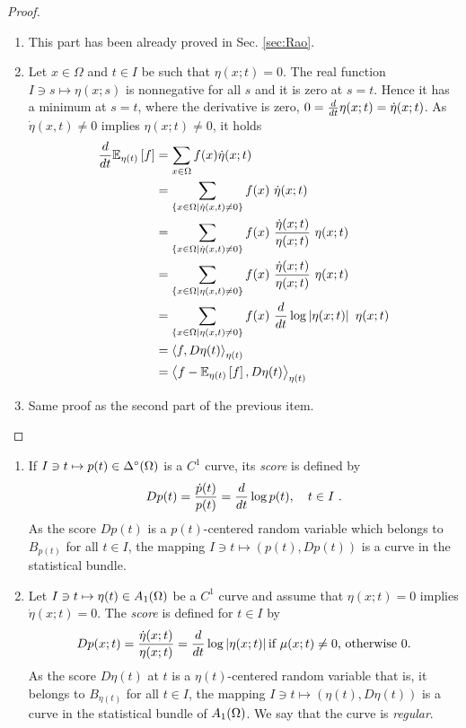 \documentclass[12pt,a4paper]{amsart}
\begin{document}
\begin{proof}
  \begin{enumerate}
  \item This part has been already proved in Sec. \ref{sec:Rao}.
  \item Let $x \in \Omega$ and $t \in I$ be such that $\eta(x;t) = 0$. The real function $I \ni s \mapsto \eta(x;s)$ is nonnegative for all $s$ and it is zero at $s=t$. Hence it has a minimum at $s=t$, where the derivative is zero, $0 = \frac{d}{dt} \eta(x;t) = \dot \eta(x;t)$. As $\dot\eta(x,t) \ne 0$ implies $\eta(x;t) \ne 0$, it holds
%
    \begin{align*}
  \derivby t \expectat {\eta(t)} {f} &= \sum_{x\in\Omega} f(x) \dot\eta(x;t) \\
&= \sum_{\setof{x\in\Omega}{\dot\eta(x,t) \ne 0}} f(x) \ \dot\eta(x;t) \\ 
&= \sum_{\setof{x\in\Omega}{\dot\eta(x,t) \ne 0}} f(x) \ \frac{\dot\eta(x;t)}{\eta(x;t)} \ \eta(x;t) \\ 
&= \sum_{\setof{x\in\Omega}{\eta(x,t) \ne 0}} f(x) \ \frac{\dot\eta(x;t)}{\eta(x;t)} \ \eta(x;t) \\ 
&= \sum_{\setof{x\in\Omega}{\eta(x,t) \ne 0}} f(x) \ \derivby t \log\avalof{\eta(x;t)} \ \eta(x;t) \\ 
&= \scalarat {\eta(t)} {f} {D\eta(t)} \\
&= \scalarat {\eta(t)} {f - \expectat {\eta(t)} f} {D\eta(t)}    
    \end{align*}
  \item Same proof as the second part of the previous item.
  \end{enumerate}
\end{proof}

\begin{definition}[Score]
\begin{enumerate}
\item
If $I \ni t \mapsto p(t) \in \Delta^\circ(\Omega)$ is a $C^1$ curve, its \emph{score} is defined by
%
\begin{equation*}
  D p(t) = \frac{\dot p(t)}{p(t)} = \derivby t \log p(t), \quad t \in I \ .
\end{equation*}
%
As the score $Dp(t)$ is a $p(t)$-centered random variable which belongs to $B_{p(t)}$ for all $t \in I$, the mapping $I \ni t \mapsto (p(t),D p(t))$ is a curve in the statistical bundle.
%
\item
Let $I \ni t \mapsto \eta(t) \in A_1(\Omega)$ be a $C^1$ curve and assume that $\eta(x;t) = 0$ implies $\dot\eta(x;t) = 0$. The \emph{score} is defined for $t \in I$ by
%
\begin{equation*}
  Dp(x;t) = \frac{\dot\eta(x;t)}{\eta(x;t)} = \frac{d}{dt} \log\left| \eta(x;t) \right| \text{if $\mu(x;t) \ne 0$, otherwise 0.}
\end{equation*}
%
As the score $D\eta(t)$ at $t$ is a $\eta(t)$-centered random variable that is, it belongs to $B_{\eta(t)}$ for all $t \in I$, the mapping $I \ni t \mapsto (\eta(t),D\eta(t))$ is a curve in the statistical bundle of $A_1(\Omega)$. We say that the curve is \emph{regular}.
%
\end{enumerate}
\end{definition}
\end{document}
